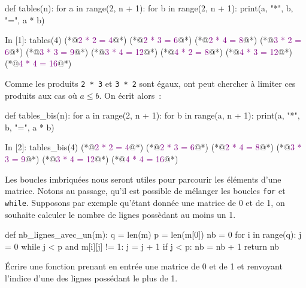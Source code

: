 \documentclass{magnolia}
\begin{document}
\begin{pythoncodeline}
def tables(n):
    for a in range(2, n + 1):
        for b in range(2, n + 1):
            print(a, "*", b, "=", a * b)
\end{pythoncodeline}
\begin{pythoncode}
In [1]: tables(4)
(*@\textcolor{purple}{2 * 2 = 4}@*)
(*@\textcolor{purple}{2 * 3 = 6}@*)
(*@\textcolor{purple}{2 * 4 = 8}@*)
(*@\textcolor{purple}{3 * 2 = 6}@*)
(*@\textcolor{purple}{3 * 3 = 9}@*)
(*@\textcolor{purple}{3 * 4 = 12}@*)
(*@\textcolor{purple}{4 * 2 = 8}@*)
(*@\textcolor{purple}{4 * 3 = 12}@*)
(*@\textcolor{purple}{4 * 4 = 16}@*)
\end{pythoncode}
Comme les produits \verb!2 * 3! et \verb!3 * 2! sont égaux, ont peut chercher à limiter
ces produits aux cas où $a \leq b$. On écrit alors~:
\begin{pythoncodeline}
def tables_bis(n):
    for a in range(2, n + 1):
        for b in range(a, n + 1):
            print(a, "*", b, "=", a * b)
\end{pythoncodeline}
\begin{pythoncode}
In [2]: tables_bis(4)
(*@\textcolor{purple}{2 * 2 = 4}@*)
(*@\textcolor{purple}{2 * 3 = 6}@*)
(*@\textcolor{purple}{2 * 4 = 8}@*)
(*@\textcolor{purple}{3 * 3 = 9}@*)
(*@\textcolor{purple}{3 * 4 = 12}@*)
(*@\textcolor{purple}{4 * 4 = 16}@*)
\end{pythoncode}

Les boucles imbriquées nous seront utiles pour parcourir les éléments d'une matrice. Notons au
passage, qu'il est possible de mélanger les boucles \verb!for! et \verb!while!.
Supposons par exemple qu'étant donnée une matrice de 0 et de 1, on souhaite calculer le
nombre de lignes possèdant au moins un 1.

\begin{pythoncodeline}
def nb_lignes_avec_un(m):
    q = len(m)
    p = len(m[0])
    nb = 0
    for i in range(q):
        j = 0
        while j < p and m[i][j] != 1:
            j = j + 1
        if j < p:
            nb = nb + 1
    return nb
\end{pythoncodeline}

\begin{exoUnique}
\exo Écrire une fonction prenant en entrée une matrice de 0 et de 1
  et renvoyant l'indice d'une des lignes possédant le plus de 1.
\end{exoUnique}


\end{document}
